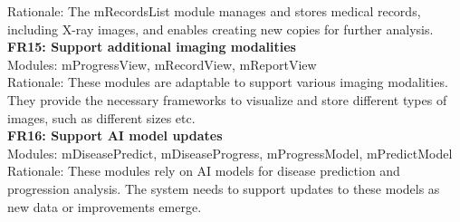 \documentclass[12pt, titlepage]{article}
\begin{document}
Rationale: The mRecordsList module manages and stores medical records, including X-ray images, and enables creating new copies for further analysis. \\
\textbf{FR15: Support additional imaging modalities} \\
Modules: mProgressView, mRecordView, mReportView \\
Rationale: These modules are adaptable to support various imaging modalities. They provide the necessary frameworks to visualize and store different types of images, such as different sizes etc. \\
\textbf{FR16: Support AI model updates} \\
Modules: mDiseasePredict, mDiseaseProgress, mProgressModel, mPredictModel \\
Rationale: These modules rely on AI models for disease prediction and progression analysis. The system needs to support updates to these models as new data or improvements emerge. \\
\end{document}
